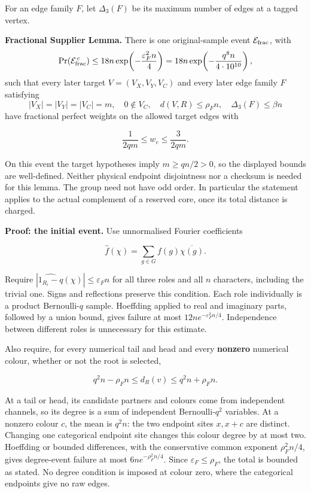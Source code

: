 \documentclass[11pt,a4paper]{article}
\newcommand{\statementstart}{\par\addvspace{6pt plus 1pt minus 1pt}\noindent}
\newcommand{\labelledparagraphstart}{\par\addvspace{3pt plus 1pt minus 1pt}\noindent}
\begin{document}
For an edge family \(F\), let \(\Delta_3(F)\) be its maximum number of edges at a tagged vertex.

\statementstart\textbf{Fractional Supplier Lemma.} There is one original-sample event \(\mathcal E_{\rm frac}\), with \[
\Pr(\mathcal E_{\rm frac}^{\,c})
\le18n\exp\!\left(-\frac{\varepsilon_F^2 n}{4}\right)
=18n\exp\!\left(-\frac{q^8n}{4\cdot10^{10}}\right),
\] such that every later target \(V=(V_X,V_Y,V_C)\) and every later edge family \(F\) satisfying \[
|V_X|=|V_Y|=|V_C|=m,\quad 0\notin V_C,\quad
d(V,R)\le\rho_F n,\quad \Delta_3(F)\le\beta n
\] have fractional perfect weights on the allowed target edges with

\[
\frac1{2qm}\le w_e\le\frac3{2qm}.
\]

On this event the target hypotheses imply \(m\ge qn/2>0\), so the displayed bounds are well-defined. Neither physical endpoint disjointness nor a checksum is needed for this lemma. The group need not have odd order. In particular the statement applies to the actual complement of a reserved core, once its total distance is charged.

\labelledparagraphstart\textbf{Proof: the initial event.} Use unnormalised Fourier coefficients

\[
\widehat f(\chi)=\sum_{g\in G}f(g)\overline{\chi(g)}.
\]

Require \(|\widehat{1_{R_i}-q}(\chi)|\le\varepsilon_F n\) for all three roles and all \(n\) characters, including the trivial one. Signs and reflections preserve this condition. Each role individually is a product Bernoulli-\(q\) sample. Hoeffding applied to real and imaginary parts, followed by a union bound, gives failure at most \(12n e^{-\varepsilon_F^2n/4}\). Independence between different roles is unnecessary for this estimate.

Also require, for every numerical tail and head and every \textbf{nonzero} numerical colour, whether or not the root is selected,

\[
q^2n-\rho_F n\le d_R(v)\le q^2n+\rho_F n.
\]

At a tail or head, its candidate partners and colours come from independent channels, so its degree is a sum of independent Bernoulli-\(q^2\) variables. At a nonzero colour \(c\), the mean is \(q^2n\): the two endpoint sites \(x,x+c\) are distinct. Changing one categorical endpoint site changes this colour degree by at most two. Hoeffding or bounded differences, with the conservative common exponent \(\rho_F^2n/4\), gives degree-event failure at most \(6n e^{-\rho_F^2n/4}\). Since \(\varepsilon_F\le\rho_F\), the total is bounded as stated. No degree condition is imposed at colour zero, where the categorical endpoints give no raw edges.
\end{document}
